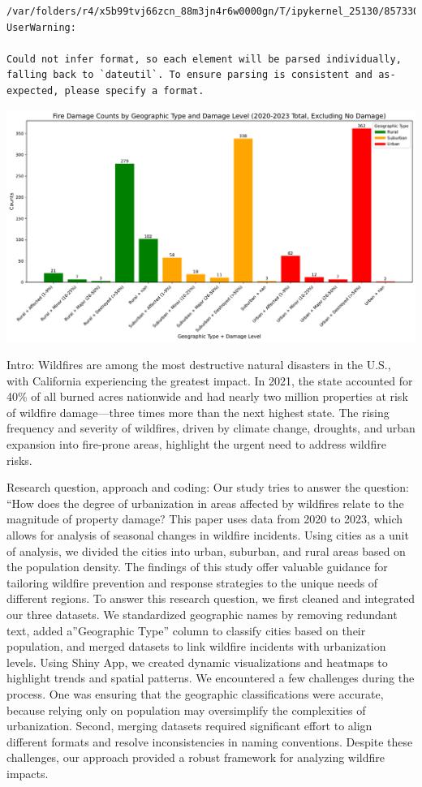 \documentclass[
  letterpaper,
  DIV=11,
  numbers=noendperiod]{scrartcl}
\begin{document}
\begin{verbatim}
/var/folders/r4/x5b99tvj66zcn_88m3jn4r6w0000gn/T/ipykernel_25130/857330891.py:1: UserWarning:

Could not infer format, so each element will be parsed individually, falling back to `dateutil`. To ensure parsing is consistent and as-expected, please specify a format.
\end{verbatim}

\includegraphics{Final Writeup_files/figure-pdf/cell-19-output-1.pdf}

Intro: Wildfires are among the most destructive natural disasters in the
U.S., with California experiencing the greatest impact. In 2021, the
state accounted for 40\% of all burned acres nationwide and had nearly
two million properties at risk of wildfire damage---three times more
than the next highest state. The rising frequency and severity of
wildfires, driven by climate change, droughts, and urban expansion into
fire-prone areas, highlight the urgent need to address wildfire risks.

Research question, approach and coding: Our study tries to answer the
question: ``How does the degree of urbanization in areas affected by
wildfires relate to the magnitude of property damage? This paper uses
data from 2020 to 2023, which allows for analysis of seasonal changes in
wildfire incidents. Using cities as a unit of analysis, we divided the
cities into urban, suburban, and rural areas based on the population
density. The findings of this study offer valuable guidance for
tailoring wildfire prevention and response strategies to the unique
needs of different regions. To answer this research question, we first
cleaned and integrated our three datasets. We standardized geographic
names by removing redundant text, added a''Geographic Type'' column to
classify cities based on their population, and merged datasets to link
wildfire incidents with urbanization levels. Using Shiny App, we created
dynamic visualizations and heatmaps to highlight trends and spatial
patterns. We encountered a few challenges during the process. One was
ensuring that the geographic classifications were accurate, because
relying only on population may oversimplify the complexities of
urbanization. Second, merging datasets required significant effort to
align different formats and resolve inconsistencies in naming
conventions. Despite these challenges, our approach provided a robust
framework for analyzing wildfire impacts.
\end{document}
